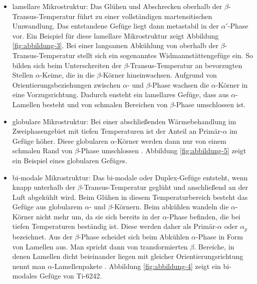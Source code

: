 \begin{itemize} 
	\item lamellare Mikrostruktur: Das Glühen und Abschrecken oberhalb der $\beta$-Transus-Temperatur führt zu einer vollständigen martensitischen Umwandlung. Das entstandene Gefüge liegt dann metastabil in der $\alpha'$-Phase vor. Ein Beispiel für diese lamellare Mikrostruktur zeigt Abbildung \ref{fig:abbildung-3}. Bei einer langsamen Abkühlung von oberhalb der $\beta$-Transus-Temperatur stellt sich ein sogenanntes Widmannstättengefüge ein. So bilden sich beim Unterschreiten der $\beta$-Transus-Temperatur an bevorzugten Stellen $\alpha$-Keime, die in die $\beta$-Körner hineinwachsen. Aufgrund von Orientierungsbeziehungen zwischen $\alpha$- und $\beta$-Phase wachsen die $\alpha$-Körner in eine Vorzugsrichtung. Dadurch ensteht ein lamellares Gefüge, dass aus $\alpha$-Lamellen besteht und von schmalen Bereichen von $\beta$-Phase umschlossen ist.
	
\item globulare Mikrostruktur: Bei einer abschließenden Wärmebehandlung im Zweiphasengebiet mit tiefen Temperaturen ist der Anteil an Primär-$\alpha$ im Gefüge höher. Diese globularen $\alpha$-Körner werden dann nur von einem schmalen Rand von $\beta$-Phase umschlossen \cite{Lutjering.2007}. Abbildung \ref{fig:abbildung-5} zeigt ein Beispiel eines globularen Gefüges.

\item bi-modale Mikrostruktur: Das bi-modale oder Duplex-Gefüge entsteht, wenn knapp unterhalb der $\beta$-Transus-Temperatur geglüht und anschließend an der Luft abgekühlt wird. Beim Glühen in diesem Temperaturbereich besteht das Gefüge aus globularem $\alpha$- und $\beta$-Körnern. Beim abkühlen wandeln die $\alpha$-Körner nicht mehr um, da sie sich bereits in der $\alpha$-Phase befinden, die bei tiefen Temperaturen beständig ist. Diese werden daher als Primär-$\alpha$ oder $\alpha_p$ bezeichnet. Aus der $\beta$-Phase scheidet sich beim Abkühlen $\alpha$-Phase in Form von Lamellen aus. Man spricht dann von transformierten $\beta$. Bereiche, in denen Lamellen dicht beieinander liegen mit gleicher Orientierungsrichtung nennt man $\alpha$-Lamellenpakete \cite{Lutjering.2007}. Abbildung \ref{fig:abbildung-4} zeigt ein bi-modales Gefüge von Ti-6242. 


\end{itemize}
